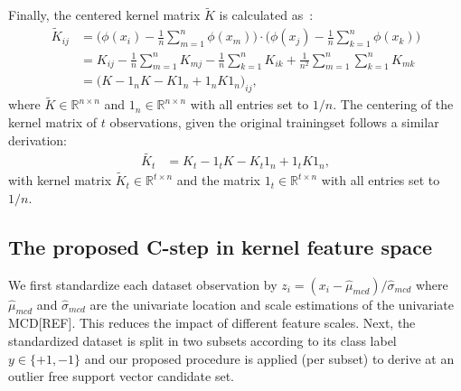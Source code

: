 \documentclass[preprint,12pt]{elsarticle}
\begin{document}
	Finally, the centered kernel matrix $\tilde{K}$ is calculated as~\cite{scholkopf1998nonlinear}:
	\begin{align}
	\label{eq:centerKh}
	\tilde{K}_{ij} &= \Big(\phi(x_i) - \frac{1}{n}\sum_{m=1}^n\phi(x_m)\Big) \cdot \Big(\phi(x_j) - \frac{1}{n}\sum_{k=1}^n\phi(x_k)\Big) \\
	&= K_{ij} - \frac{1}{n}\sum_{m=1}^n K_{mj} - \frac{1}{n}\sum_{k=1}^n K_{ik} + \frac{1}{n^2}\sum_{m=1}^n\sum_{k=1}^n K_{mk} \\
	&= \Big(K - 1_n K - K1_n + 1_n K1_n\Big)_{ij},
	\end{align}
	where $ \tilde{K} \in \mathbb{R}^{n \times n}$ and $1_n \in \mathbb{R}^{n\times n}$ with all entries set to $1/n$. 
	The centering of the kernel matrix of $t$ observations, given the original trainingset follows a similar derivation:
	\begin{align}
	\tilde{K_t} &= K_t - 1_t K - K_t 1_n + 1_t K1_n,
	\end{align}
	with kernel matrix $ \tilde{K}_t \in \mathbb{R}^{t \times n}$ and the matrix $1_t \in \mathbb{R}^{t \times n}$ with all entries set to $1/n$.
	
	\subsection{The proposed C-step in kernel feature space}
	
	We first standardize each dataset observation by $z_i = (x_i - \hat{\mu}_{mcd}) / \hat{\sigma}_{mcd}$ where $\hat{\mu}_{mcd}$ and $\hat{\sigma}_{mcd}$ are the univariate location and scale estimations of the univariate MCD[REF]. This reduces the impact of different feature scales. Next, the standardized dataset is split in two subsets according to its class label $y \in \{+1, -1\}$ and our proposed  procedure is applied (per subset) to derive at an outlier free support vector candidate set. 
	
\end{document}
